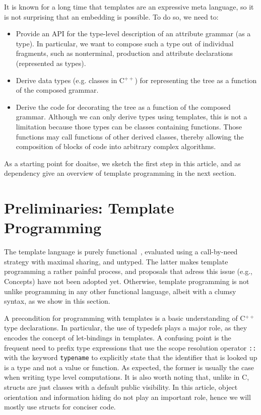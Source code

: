 \documentclass{llncs}
\newcommand*{\Cpp}{C\ensuremath{^{++}}}
\begin{document}
  It is known for a long time that templates are
  an expressive meta language, so it is not surprising that an
  embedding is possible. To do so, we need to:
  \begin{itemize}
  \item Provide an API for the type-level description of an
    attribute grammar (as a type). In particular, we want to
    compose such a type out of individual fragments, such as
    nonterminal, production and attribute declarations (represented
    as types).
  \item Derive data types (e.g. classes in \Cpp) for representing
    the tree as a function of the composed grammar.
  \item Derive the code for decorating the tree as a function of
    the composed grammar. Although we can only derive types using
    templates, this is not a limitation because those types can
    be classes containing functions. Those functions may call
    functions of other derived classes, thereby allowing the
    composition of blocks of code into arbitrary complex
    algorithms.
  \end{itemize}
  As a starting point for doaitse, we sketch the first step in this article,
  and as dependency give an overview of template programming in the
  next section.

\section{Preliminaries: Template Programming}
\label{sect:templates}

  The template language is purely functional~\cite{DBLP:dblp_journals/entcs/Sinkovics11},
  evaluated using a call-by-need strategy with maximal sharing, and untyped.
  The latter makes template programming a rather painful process,
  and proposals that adress this issue (e.g., Concepts) have not been adopted yet.
  Otherwise, template programming is not unlike programming in any other
  functional language, albeit with a clumsy syntax, as we show
  in this section.

  A precondition for programming with templates is a basic understanding of \Cpp{} type
  declarations.
  In particular, the use of typedefs plays a
  major role, as they encodes the concept of let-bindings in templates.
  A confusing point is the frequent need to prefix type expressions that use
  the scope resolution operator \lstinline$::$ with the keyword
  \lstinline$typename$ to explicitly state that the identifier that
  is looked up is a type and not a value or function. As expected, the
  former is usually the case when writing type level computations.
  It is also worth noting that, unlike in C, structs are just
  classes with a default public visibility. In this article, object
  orientation and information hiding do not play an important role, hence
  we will mostly use structs for conciser code.
\end{document}

